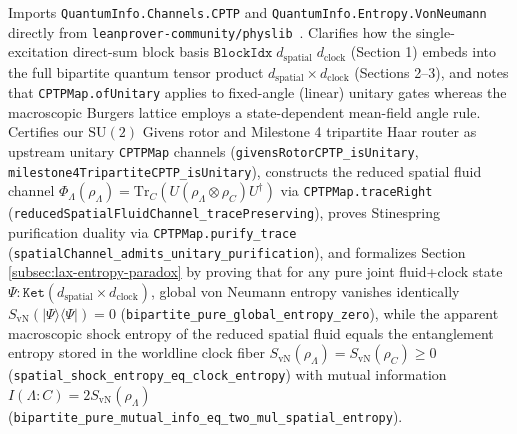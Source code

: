 \documentclass[11pt,a4paper]{article}
\theoremstyle{definition}
\begin{document}
\begin{enumerate}
Imports \texttt{QuantumInfo.\allowbreak{}Channels.\allowbreak{}CPTP} and \texttt{QuantumInfo.\allowbreak{}Entropy.\allowbreak{}VonNeumann} directly from \texttt{leanprover-\allowbreak{}community/\allowbreak{}physlib}~\cite{tooby2024}. Clarifies how the single-excitation direct-sum block basis $\texttt{BlockIdx}\;d_{\text{spatial}}\;d_{\text{clock}}$ (Section 1) embeds into the full bipartite quantum tensor product $d_{\text{spatial}} \times d_{\text{clock}}$ (Sections 2--3), and notes that \texttt{CPTPMap.ofUnitary} applies to fixed-angle (linear) unitary gates whereas the macroscopic Burgers lattice employs a state-dependent mean-field angle rule. Certifies our $\mathrm{SU}(2)$ Givens rotor and Milestone 4 tripartite Haar router as upstream unitary \texttt{CPTPMap} channels (\texttt{givensRotorCPTP\_\allowbreak{}isUnitary}, \texttt{milestone4TripartiteCPTP\_\allowbreak{}isUnitary}), constructs the reduced spatial fluid channel $\Phi_{\Lambda}(\rho_{\Lambda}) = \mathrm{Tr}_C(U(\rho_{\Lambda} \otimes \rho_C)U^\dagger)$ via \texttt{CPTPMap.\allowbreak{}traceRight} (\texttt{reducedSpatialFluidChannel\_\allowbreak{}tracePreserving}), proves Stinespring purification duality via \texttt{CPTPMap.\allowbreak{}purify\_\allowbreak{}trace} (\texttt{spatialChannel\_\allowbreak{}admits\_\allowbreak{}unitary\_\allowbreak{}purification}), and formalizes Section \ref{subsec:lax-entropy-paradox} by proving that for any pure joint fluid+clock state $\Psi : \texttt{Ket}(d_{\text{spatial}} \times d_{\text{clock}})$, global von Neumann entropy vanishes identically $S_{\text{vN}}(|\Psi\rangle\langle\Psi|) = 0$ (\texttt{bipartite\_\allowbreak{}pure\_\allowbreak{}global\_\allowbreak{}entropy\_\allowbreak{}zero}), while the apparent macroscopic shock entropy of the reduced spatial fluid equals the entanglement entropy stored in the worldline clock fiber $S_{\text{vN}}(\rho_{\Lambda}) = S_{\text{vN}}(\rho_C) \ge 0$ (\texttt{spatial\_\allowbreak{}shock\_\allowbreak{}entropy\_\allowbreak{}eq\_\allowbreak{}clock\_\allowbreak{}entropy}) with mutual information $I(\Lambda : C) = 2 S_{\text{vN}}(\rho_{\Lambda})$ (\texttt{bipartite\_\allowbreak{}pure\_\allowbreak{}mutual\_\allowbreak{}info\_\allowbreak{}eq\_\allowbreak{}two\_\allowbreak{}mul\_\allowbreak{}spatial\_\allowbreak{}entropy}).
\end{enumerate}
\end{document}
